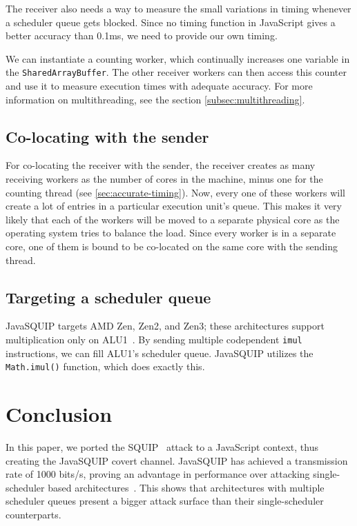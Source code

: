 \documentclass[11pt,
  titlepage=false,
]{scrreprt}
\begin{document}

The receiver also needs a way to measure the small variations in timing whenever a scheduler queue gets blocked.
Since no timing function in JavaScript gives a better accuracy than 0.1ms, we need to provide our own timing.

We can instantiate a counting worker, which continually increases one variable in the \texttt{SharedArrayBuffer}.
The other receiver workers can then access this counter and use it to measure execution times with adequate accuracy.
For more information on multithreading, see the section \ref{subsec:multithreading}.

\section{Co-locating with the sender}
\label{sec:colocation}
For co-locating the receiver with the sender, the receiver creates as many receiving workers as the number of cores in the machine, minus one for the counting thread (see \ref{sec:accurate-timing}).
Now, every one of these workers will create a lot of entries in a particular execution unit's queue.
This makes it very likely that each of the workers will be moved to a separate physical core as the operating system tries to balance the load.
Since every worker is in a separate core, one of them is bound to be co-located on the same core with the sending thread.


\section{Targeting a scheduler queue}
JavaSQUIP targets AMD Zen, Zen2, and Zen3;
these architectures support multiplication only on ALU1~\cite{AMD2020OptimizationEPYC7003}.
By sending multiple codependent \texttt{imul} instructions, we can fill ALU1's scheduler queue.
JavaSQUIP utilizes the \texttt{Math.imul()} function, which does exactly this.


\chapter{Conclusion}
\label{ch:conclusion}
In this paper, we ported the SQUIP~\cite{squip} attack to a JavaScript context, thus creating the JavaSQUIP covert channel.
JavaSQUIP has achieved a transmission rate of 1000 bits/s, proving an advantage in performance over attacking single-scheduler based architectures~\cite{Rokicki2022webport}.
This shows that architectures with multiple scheduler queues present a bigger attack surface than their single-scheduler counterparts.
\end{document}
